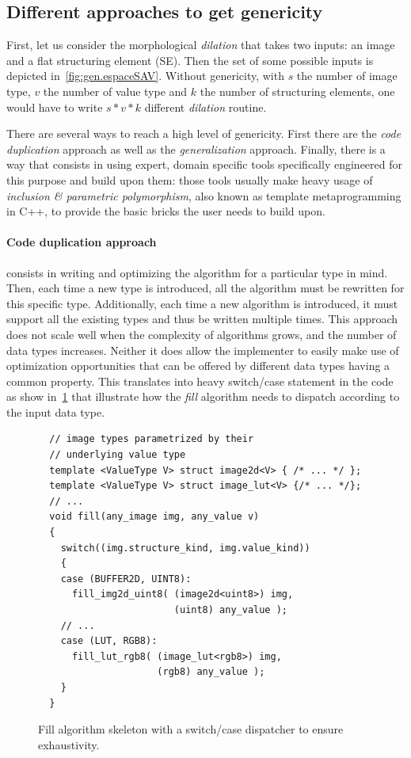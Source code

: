 \subsection{Different approaches to get genericity}
\label{subsec:different.approaches}

First, let us consider the morphological \emph{dilation} that takes two inputs: an image and a flat structuring element
(SE). Then the set of some possible inputs is depicted in~\ref{fig:gen.espaceSAV}. Without genericity, with $s$ the
number of image type, $v$ the number of value type and $k$ the number of structuring elements, one would have to write
$s * v * k$ different \emph{dilation} routine.

There are several ways to reach a high level of genericity. First there are the \emph{code duplication} approach as well
as the \emph{generalization} approach. Finally, there is a way that consists in using expert, domain specific tools
specifically engineered for this purpose and build upon them: those tools usually make heavy usage of \emph{inclusion
  \& parametric polymorphism}, also known as template metaprogramming in C++, to provide the basic bricks the user needs
to build upon.

\paragraph{Code duplication approach} consists in writing and optimizing the algorithm for a particular type in mind.
Then, each time a new type is introduced, all the algorithm must be rewritten for this specific type. Additionally, each
time a new algorithm is introduced, it must support all the existing types and thus be written multiple times. This
approach does not scale well when the complexity of algorithms grows, and the number of data types increases. Neither it
does allow the implementer to easily make use of optimization opportunities that can be offered by different data types
having a common property. This translates into heavy switch/case statement in the code as show in~\ref{code:gen.exhau}
that illustrate how the \emph{fill} algorithm needs to dispatch according to the input data type.

\begin{figure}[tbh]
  \centering
  \begin{verbatim}
  // image types parametrized by their
  // underlying value type
  template <ValueType V> struct image2d<V> { /* ... */ };
  template <ValueType V> struct image_lut<V> {/* ... */};
  // ...
  void fill(any_image img, any_value v)
  {
    switch((img.structure_kind, img.value_kind))
    {
    case (BUFFER2D, UINT8):
      fill_img2d_uint8( (image2d<uint8>) img,
                        (uint8) any_value );
    // ...
    case (LUT, RGB8):
      fill_lut_rgb8( (image_lut<rgb8>) img,
                     (rgb8) any_value );
    }
  }
  \end{verbatim}
  \caption{Fill algorithm skeleton with a switch/case dispatcher to ensure exhaustivity.}
  \label{code:gen.exhau}
\end{figure}


